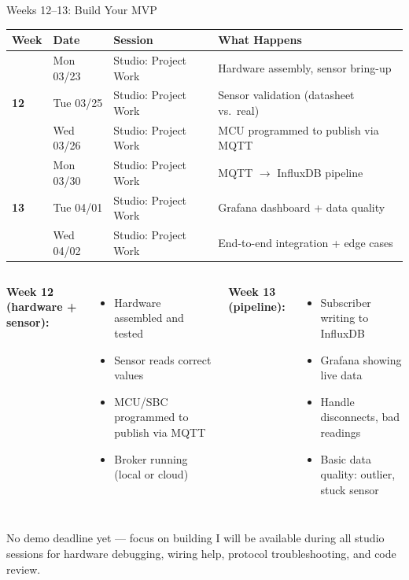 \documentclass[aspectratio=169,11pt]{beamer}
\begin{document}
\begin{frame}{Weeks 12--13: Build Your MVP}
    \begin{center}
    \scriptsize
    \begin{tabular}{llll}
        \toprule
        \textbf{Week} & \textbf{Date} & \textbf{Session} & \textbf{What Happens} \\
        \midrule
        \multirow{3}{*}{\textbf{12}} & Mon 03/23 & Studio: Project Work & Hardware assembly, sensor bring-up \\
        & Tue 03/25 & Studio: Project Work & Sensor validation (datasheet vs.\ real) \\
        & Wed 03/26 & Studio: Project Work & MCU programmed to publish via MQTT \\
        \midrule
        \multirow{3}{*}{\textbf{13}} & Mon 03/30 & Studio: Project Work & MQTT $\rightarrow$ InfluxDB pipeline \\
        & Tue 04/01 & Studio: Project Work & Grafana dashboard + data quality \\
        & Wed 04/02 & Studio: Project Work & End-to-end integration + edge cases \\
        \bottomrule
    \end{tabular}
    \normalsize
    \end{center}

    \vspace{0.2cm}
    \begin{columns}
        \textbf{Week 12 (hardware + sensor):}
        \begin{itemize}
            \item Hardware assembled and tested
            \item Sensor reads correct values
            \item MCU/SBC programmed to publish via MQTT
            \item Broker running (local or cloud)
        \end{itemize}

        \textbf{Week 13 (pipeline):}
        \begin{itemize}
            \item Subscriber writing to InfluxDB
            \item Grafana showing live data
            \item Handle disconnects, bad readings
            \item Basic data quality: outlier, stuck sensor
        \end{itemize}
    \end{columns}

    \vspace{0.2cm}
    \begin{alertblock}{No demo deadline yet --- focus on building}
        I will be available during all studio sessions for hardware debugging, wiring help, protocol troubleshooting, and code review.
    \end{alertblock}
\end{frame}
\end{document}
